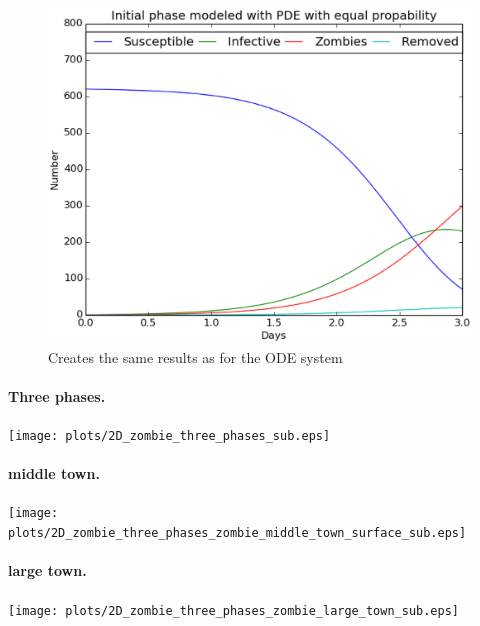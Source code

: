 \documentclass[%
twoside,                 %
final,                   %
10pt]{article}
\begin{document}
\begin{figure}[ht]
  \centerline{\includegraphics[width=0.8\linewidth]{plots/2D_zombie_initial_cond_number.eps}}
  \caption{
  Creates the same results as for the ODE system
  }
\end{figure}


\paragraph{Three phases.}
\begin{center}  %
  \centerline{\texttt{[image: plots/2D\_zombie\_three\_phases\_sub.eps]}}
\end{center}


\paragraph{middle town.}
\begin{center}  %
  \centerline{\texttt{[image: plots/2D\_zombie\_three\_phases\_zombie\_middle\_town\_surface\_sub.eps]}}
\end{center}


\paragraph{large town.}
\begin{center}  %
  \centerline{\texttt{[image: plots/2D\_zombie\_three\_phases\_zombie\_large\_town\_sub.eps]}}
\end{center}
\end{document}
